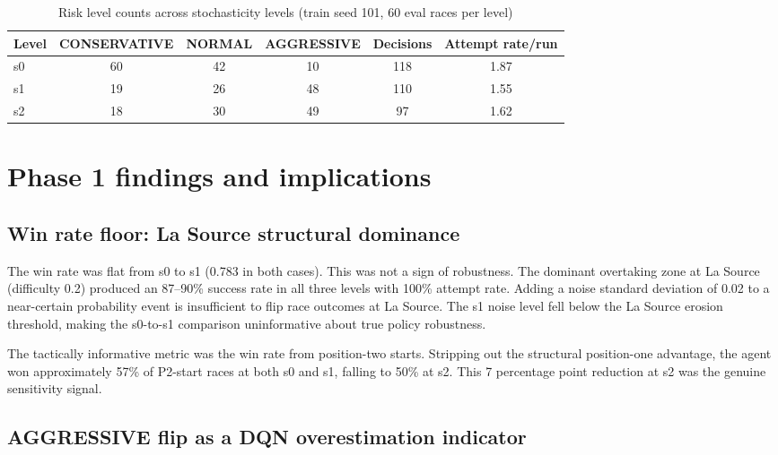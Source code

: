 \begin{appendices}
\begin{table}[htbp]
\centering
\small
\caption{Risk level counts across stochasticity levels (train seed 101, 60 eval races per level)}
\label{tab:phase1-risk-levels}
\begin{tabular}{|l|c|c|c|c|c|}
\hline
\textbf{Level} & \textbf{CONSERVATIVE} & \textbf{NORMAL} & \textbf{AGGRESSIVE} & \textbf{Decisions} & \textbf{Attempt rate/run} \\
\hline
s0 & 60 & 42 & 10 & 118 & 1.87 \\
s1 & 19 & 26 & 48 & 110 & 1.55 \\
s2 & 18 & 30 & 49 &  97 & 1.62 \\
\hline
\end{tabular}
\end{table}

\section{Phase 1 findings and implications}

\subsection{Win rate floor: La Source structural dominance}

The win rate was flat from s0 to s1 (0.783 in both cases). This was not a sign of robustness. The dominant overtaking zone at La Source (difficulty 0.2) produced an 87--90\% success rate in all three levels with 100\% attempt rate. Adding a noise standard deviation of 0.02 to a near-certain probability event is insufficient to flip race outcomes at La Source. The s1 noise level fell below the La Source erosion threshold, making the s0-to-s1 comparison uninformative about true policy robustness.

The tactically informative metric was the win rate from position-two starts. Stripping out the structural position-one advantage, the agent won approximately 57\% of P2-start races at both s0 and s1, falling to 50\% at s2. This 7 percentage point reduction at s2 was the genuine sensitivity signal.

\subsection{AGGRESSIVE flip as a DQN overestimation indicator}


\end{appendices}
